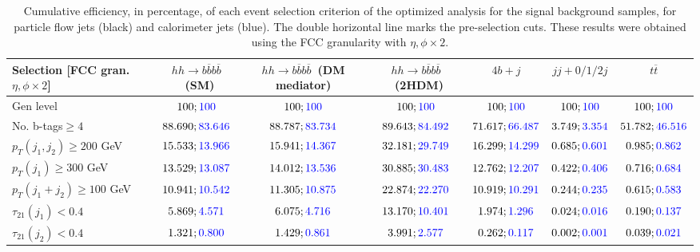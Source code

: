 \begin{landscape}
		\begin{table}
			\centering
			\caption{Cumulative efficiency, in percentage, of each event selection criterion of the optimized analysis for the signal background samples, for particle flow jets (black) and calorimeter jets (blue). The double horizontal line marks the pre-selection cuts. These results were obtained using the FCC granularity with $\eta,\phi\times 2$.}
			\begin{tabular}{lcccccc}
				\toprule 
				\textbf{Selection [FCC gran. $\eta,\phi\times 2$]} & $hh\rightarrow b\overline{b}b\overline{b}$~(SM) & $hh\rightarrow b\overline{b}b\overline{b}$~(DM mediator) & $hh\rightarrow b\overline{b}b\overline{b}$~(2HDM) & $4b+j$  & $jj+0/1/2 j$ & $t\overline{t}$ \\
				\midrule
				Gen level & $100;\textcolor{blue}{100}$ & $100;\textcolor{blue}{100}$ &$100;\textcolor{blue}{100}$& $100;\textcolor{blue}{100}$& $100;\textcolor{blue}{100}$& $100;\textcolor{blue}{100}$ \\
				\rowcolor{black!7}No. b-tags$\geq 4$&$88.690;\textcolor{blue}{83.646}$&$88.787;\textcolor{blue}{83.734}$&$89.643;\textcolor{blue}{84.492}$&$71.617;\textcolor{blue}{66.487}$&$3.749;\textcolor{blue}{3.354}$&$51.782;\textcolor{blue}{46.516}$\\
				$p_T(j_1,j_2)\geq200$ GeV & $15.533;\textcolor{blue}{13.966}$ & $15.941;\textcolor{blue}{14.367}$&$32.181;\textcolor{blue}{29.749}$ &$16.299;\textcolor{blue}{14.299}$&$0.685;\textcolor{blue}{0.601}$&$0.985;\textcolor{blue}{0.862}$\\ 
				\midrule \midrule
				\rowcolor{black!7}$p_T(j_1)\geq 300$ GeV & $13.529;\textcolor{blue}{13.087}$ &$14.012;\textcolor{blue}{13.536}$  &$30.885;\textcolor{blue}{30.483}$&$12.762;\textcolor{blue}{12.207}$&$0.422;\textcolor{blue}{0.406}$&$0.716;\textcolor{blue}{0.684}$\\ 
				$p_T(j_1+j_2)\geq 100$ GeV &$10.941;\textcolor{blue}{10.542}$ & $11.305;\textcolor{blue}{10.875}$ &$22.874;\textcolor{blue}{22.270}$&$10.919;\textcolor{blue}{10.291}$&$0.244;\textcolor{blue}{0.235}$&$0.615;\textcolor{blue}{0.583}$\\
				\rowcolor{black!7}$\tau_{21}(j_1)<0.4$ & $5.869;\textcolor{blue}{4.571}$& $6.075;\textcolor{blue}{4.716}$&$13.170;\textcolor{blue}{10.401}$&$1.974;\textcolor{blue}{1.296}$&$0.024;\textcolor{blue}{0.016}$&$0.190;\textcolor{blue}{0.137}$\\
				$\tau_{21}(j_2)<0.4$ &$1.321;\textcolor{blue}{0.800}$ &$1.429;\textcolor{blue}{0.861}$ &$3.991;\textcolor{blue}{2.577}$&$0.262;\textcolor{blue}{0.117}$&$0.002;\textcolor{blue}{0.001}$&$0.039;\textcolor{blue}{0.021}$\\

\end{tabular}
\end{table}
\end{landscape}
